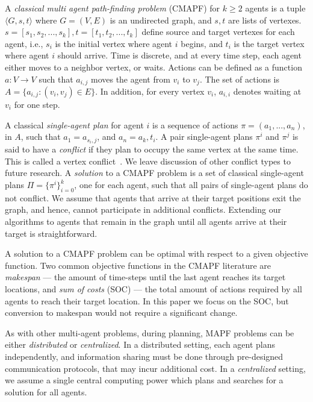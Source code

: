 \documentclass[letterpaper]{article} %
\begin{document}
A \emph{classical multi agent path-finding problem} (CMAPF) \cite[e.g.][]{stern2019multi} for $k \geq 2$ agents is a tuple $\langle G,s,t \rangle$
where $G = (V, E)$ is an undirected graph, and $s,t$ are lists of vertexes. $s = [s_1, s_2, ..., s_k], t = [t_1, t_2, ..., t_k]$ define source and target vertexes for each agent, i.e., $s_i$ is the initial vertex where agent $i$ begins, and $t_i$ is the target vertex where agent $i$ should arrive.
Time is discrete, and at every time step, each
agent either moves to a neighbor vertex, or waits. Actions can be defined as a function $a : V \rightarrow V$ such that $a_{i,j}$ moves the agent from $v_i$ to $v_j$. The set of actions is $A=\{a_{i,j}:(v_i, v_j) \in E\}$. In addition, for every vertex $v_i$, $a_{i,i}$ denotes waiting at $v_i$ for one step.

A classical \emph{single-agent plan} for agent $i$ is a sequence of actions $\pi = (a_1, . . ., a_n)$, in $A$, such that $a_1=a_{s_i,j}$, and $a_n=a_k,t_i$.
A pair single-agent plans $\pi^i$ and $\pi^j$ is said to have a \emph{conflict} if they plan to occupy the same vertex at the same time. This is called a vertex conflict~\cite{stern2019multi}. We leave discussion of other conflict types to future research.
A \emph{solution} to a CMAPF problem is a set of classical single-agent plans $\Pi = \{ \pi^i \}_{i=0}^k $, one for each agent, such that all pairs of single-agent plans do not conflict.
We assume that agents that arrive at their target positions exit the graph, and hence, cannot participate in additional conflicts. Extending our algorithms to agents that remain in the graph until all agents arrive at their target is straightforward.



A solution to a CMAPF problem can be optimal with respect to a given objective function.
Two common objective functions in the CMAPF literature are \emph{makespan} --- the amount of time-steps until
the last agent reaches its target locations, and \emph{sum of costs} (SOC) --- the total amount of actions required by all agents to reach their target location. In this paper we focus on the SOC, but conversion to makespan would not require a significant change.

As with other multi-agent problems, during planning, MAPF problems can be either \emph{distributed} or \emph{centralized}. In a distributed setting, each agent plans independently, and information sharing must be done through pre-designed communication protocols, that may incur additional cost. In a \emph{centralized} setting, we assume a single central computing power which plans and searches for a solution for all agents.
\end{document}
